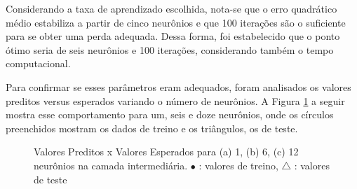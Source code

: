 \documentclass[brazil,tf,epusp]{usp}  %
\begin{document}
Considerando a taxa de aprendizado escolhida, nota-se que o erro quadrático médio estabiliza a partir de cinco neurônios e que 100 iterações são o suficiente para se obter uma perda adequada. Dessa forma, foi estabelecido que o ponto ótimo seria de seis neurônios e 100 iterações, considerando também o tempo computacional.

Para confirmar se esses parâmetros eram adequados, foram analisados os valores preditos versus esperados variando o número de neurônios. A Figura \ref{fig:predict_NN} a seguir mostra esse comportamento para um, seis e doze neurônios, onde os círculos preenchidos mostram os dados de treino e os triângulos, os de teste.

\begin{figure}[!h]

\caption{Valores Preditos x Valores Esperados para (a) 1, (b) 6, (c) 12 neurônios na camada intermediária. $\bullet$ : valores de treino, $\bigtriangleup$ : valores de teste}
\label{fig:predict_NN}
\end{figure}
\end{document}

